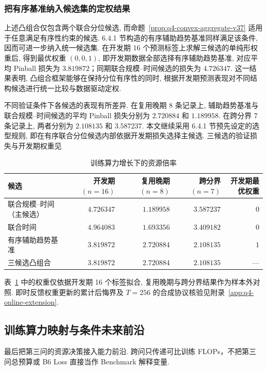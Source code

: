 \subsubsection{把有序基准纳入候选集的定权结果}\label{par:q4-aggregation-baseline}


上述凸组合仅包含两个联合分位候选, 而命题~\ref{prop:q4-convex-aggregate-v37} 适用于任意满足有序性约束的候选. 6.4.1 节构造的有序辅助趋势基准同样满足该条件, 因而可进一步纳入统一候选集. 在开发期 16 个预测标签上求解三候选的单纯形权重后, 得到最优权重 $(0,0,1)$, 即开发期数据全部选择有序辅助趋势基准, 对应平均 Pinball 损失为 $3.819872$；同期联合规模--时间候选的损失为 $4.726347$. 这一结果表明, 凸组合框架能够在保持分位有序性的同时, 根据开发期预测表现对不同结构候选进行统一比较与数据驱动定权.

不同验证条件下各候选的表现有所差异. 在复用晚期 8 条记录上, 辅助趋势基准与联合规模--时间候选的平均 Pinball 损失分别为 $2.720884$ 和 $1.189958$. 在跨分界 7 条记录上, 两者分别为 $2.108135$ 和 $3.587237$. 本文继续采用 6.4.1 节预先设定的选型规则, 即在有序联合分位候选内部依据开发期损失选择主候选. 三候选的验证损失与开发期权重见

\begin{table}[H]\centering\footnotesize
\setlength{\tabcolsep}{4pt}
\caption{训练算力增长下的资源倍率}\label{tab:q4-aggregation-baseline}
\begin{tabular}{lrrrr}\toprule
候选 & 开发期 $(n=16)$ & 复用晚期 $(n=8)$ & 跨分界 $(n=7)$ & 开发期最优权重\\\midrule
联合规模--时间（主候选） & $4.726347$ & $1.189958$ & $3.587237$ & $0$\\
联合时间 & $4.964083$ & $1.693356$ & $3.409182$ & $0$\\
有序辅助趋势基准 & $3.819872$ & $2.720884$ & $2.108135$ & $1$\\\midrule
三候选凸组合 & $3.819872$ & $2.720884$ & $2.108135$ & ---\\\bottomrule
\end{tabular}
\end{table} 
表~\ref{tab:q4-aggregation-baseline} 中的权重仅依据开发期 16 个标签拟合, 复用晚期与跨分界结果作为样本外对照. 即时反馈权重更新的累计后悔界及 $T=256$ 的合成协议核验见附录~\ref{app:q4-online-extension}. 
\subsection{训练算力映射与条件未来前沿}

最后把第三问的资源决策接入能力前沿. 跨问只传递可比训练 FLOPs，不把第三问总预算或 B6 Loss 直接当作 Benchmark 解释变量. 

